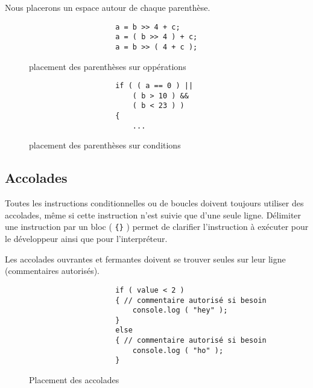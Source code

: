 			Nous placerons un espace autour de chaque parenthèse.

			\begin{figure}[H]
				\begin{changemargin}{-2.5cm}{-2.5cm}
				\begin{tcolorbox}
				\begin{verbatim}
					a = b >> 4 + c;
					a = ( b >> 4 ) + c;
					a = b >> ( 4 + c );
				\end{verbatim}
				\end{tcolorbox}
				\end{changemargin}
				\caption{placement des parenthèses sur oppérations}

				\begin{changemargin}{-2.5cm}{-2.5cm}
				\begin{tcolorbox}
				\begin{verbatim}
					if ( ( a == 0 ) ||
					    ( b > 10 ) &&
					    ( b < 23 ) )
					{
					    ...
				\end{verbatim}
				\end{tcolorbox}
				\end{changemargin}
				\caption{placement des parenthèses sur conditions}
			\end{figure}

		\subsection{Accolades}
			Toutes les instructions conditionnelles ou de boucles doivent toujours utiliser des accolades, même si cette instruction n'est suivie que d'une seule ligne. Délimiter une instruction par un bloc ( \verb+{}+ ) permet de clarifier l'instruction à exécuter pour le développeur ainsi que pour l'interpréteur.

			Les accolades ouvrantes et fermantes doivent se trouver seules sur leur ligne (commentaires autorisés).

			\begin{figure}[H]
				\begin{changemargin}{-2.5cm}{-2.5cm}
				\begin{tcolorbox}
				\begin{verbatim}
					if ( value < 2 )
					{ // commentaire autorisé si besoin
					    console.log ( "hey" );
					}
					else
					{ // commentaire autorisé si besoin
					    console.log ( "ho" );
					}
				\end{verbatim}
				\end{tcolorbox}
				\end{changemargin}
				\caption{Placement des accolades}
			\end{figure}

